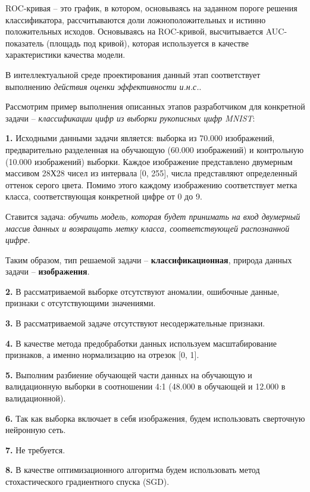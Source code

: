 				ROC-кривая -- это график, в котором, основываясь на заданном пороге решения классификатора, рассчитываются доли ложноположительных и истинно положительных исходов. Основываясь на ROC-кривой, высчитывается AUC-показатель (площадь под кривой), которая используется в качестве характеристики качества модели.
				
				В интеллектуальной среде проектирования данный этап соответствует выполнению \textit{действия оценки эффективности и.н.с.}.
				
				Рассмотрим пример выполнения описанных этапов разработчиком для конкретной задачи -- \textit{классификации цифр из выборки рукописных цифр MNIST}:
				
				\textbf{1.} Исходными данными задачи является: выборка из 70.000 изображений, предварительно разделенная на обучающую (60.000 изображений) и контрольную (10.000 изображений) выборки. Каждое изображение представлено двумерным массивом 28Х28 чисел из интервала [0, 255], числа представляют определенный оттенок серого цвета. Помимо этого каждому изображению соответствует метка класса, соответствующая конкретной цифре от 0 до 9.
				
				Ставится задача: \textit{обучить модель, которая будет принимать на вход двумерный массив данных и возвращать метку класса, соответствующей распознанной цифре.}
				
				Таким образом, тип решаемой задачи -- \textbf{классификационная}, природа данных задачи -- \textbf{изображения}.
				
				\textbf{2.} В рассматриваемой выборке отсутствуют аномалии, ошибочные данные, признаки с отсутствующими значениями.
				
				\textbf{3.} В рассматриваемой задаче отсутствуют несодержательные признаки.
				
				\textbf{4.} В качестве метода предобработки данных используем масштабирование признаков, а именно нормализацию на отрезок [0, 1].
				
				\textbf{5.} Выполним разбиение обучающей части данных на обучающую и валидационную выборки в соотношении 4:1 (48.000 в обучающей и 12.000 в валидационной).
				
				\textbf{6.} Так как выборка включает в себя изображения, будем использовать сверточную нейронную сеть.
				
				\textbf{7.} Не требуется.
				
				\textbf{8.} В качестве оптимизационного алгоритма будем использовать метод стохастического градиентного спуска (SGD).
				
